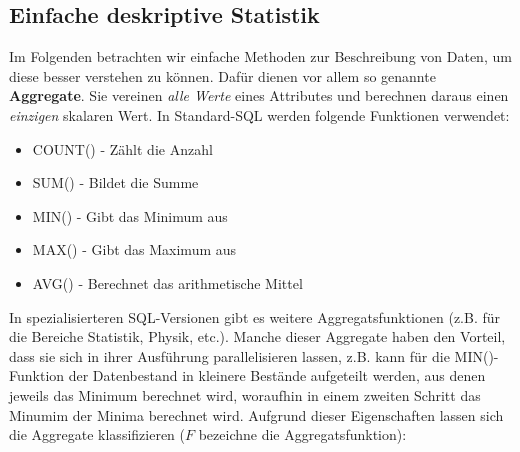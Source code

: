 \subsection{Einfache deskriptive Statistik}
Im Folgenden betrachten wir einfache Methoden zur Beschreibung von Daten, um diese besser verstehen zu können. Dafür dienen vor allem so genannte \textbf{Aggregate}. Sie vereinen \textit{alle Werte} eines Attributes und berechnen daraus einen \textit{einzigen} skalaren Wert. In Standard-SQL werden folgende Funktionen verwendet: 
\begin{itemize}
	\item COUNT() - Zählt die Anzahl
	\item SUM() - Bildet die Summe
	\item MIN() - Gibt das Minimum aus
	\item MAX() - Gibt das Maximum aus
	\item AVG() - Berechnet das arithmetische Mittel
\end{itemize}
In spezialisierteren SQL-Versionen gibt es weitere Aggregatsfunktionen (z.B. für die Bereiche Statistik, Physik, etc.). Manche dieser Aggregate haben den Vorteil, dass sie sich in ihrer Ausführung parallelisieren lassen, z.B. kann für die MIN()-Funktion der Datenbestand in kleinere Bestände aufgeteilt werden, aus denen jeweils das Minimum berechnet wird, woraufhin in einem zweiten Schritt das Minumim der Minima berechnet wird.
Aufgrund dieser Eigenschaften lassen sich die Aggregate klassifizieren (\(F\) bezeichne die Aggregatsfunktion):
